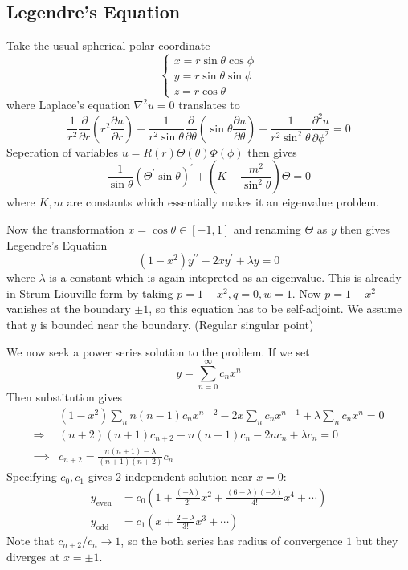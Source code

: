 \documentclass[a4paper]{article}
\begin{document}
\subsection{Legendre's Equation}
Take the usual spherical polar coordinate
$$\begin{cases}
    x=r\sin\theta\cos\phi\\
    y=r\sin\theta\sin\phi\\
    z=r\cos\theta
\end{cases}$$
where Laplace's equation $\nabla^2 u=0$ translates to
$$\frac{1}{r^2}\frac{\partial}{\partial r}\left( r^2\frac{\partial u}{\partial r} \right)+\frac{1}{r^2\sin\theta}\frac{\partial}{\partial\theta}\left( \sin\theta\frac{\partial u}{\partial\theta} \right)+\frac{1}{r^2\sin^2\theta}\frac{\partial^2u}{\partial\phi^2}=0$$
Seperation of variables $u=R(r)\Theta(\theta)\Phi(\phi)$ then gives
$$\frac{1}{\sin\theta}(\Theta^\prime\sin\theta)^\prime+\left( K-\frac{m^2}{\sin^2\theta} \right)\Theta=0$$
where $K,m$ are constants which essentially makes it an eigenvalue problem.

Now the transformation $x=\cos\theta\in[-1,1]$ and renaming $\Theta$ as $y$ then gives Legendre's Equation
\begin{equation}\label{2.eq.21:legendre}
    (1-x^2)y^{\prime\prime}-2xy^\prime+\lambda y=0
\end{equation}
where $\lambda$ is a constant which is again intepreted as an eigenvalue.
This is already in Strum-Liouville form by taking $p=1-x^2,q=0,w=1$.
Now $p=1-x^2$ vanishes at the boundary $\pm 1$, so this equation has to be self-adjoint.
We assume that $y$ is bounded near the boundary. (Regular singular point)

We now seek a power series solution to the problem.
If we set
$$y=\sum_{n=0}^\infty c_nx^n$$
Then substitution gives 
\begin{align}\label{2.eq.22}
    &(1-x^2)\sum_n n(n-1)c_nx^{n-2}-2x \sum_n c_n x^{n-1} + \lambda \sum_n c_n x^n=0\nonumber\\
    \Longrightarrow & (n+2)(n+1)c_{n+2}-n(n-1)c_n-2nc_n+\lambda c_n=0\nonumber\\ 
    \implies &c_{n+2}=\frac{n(n+1)-\lambda}{(n+1)(n+2)}c_n
\end{align}
Specifying $c_0,c_1$ gives 2 independent solution near $ x=0 $:
\begin{align*}
    y_{\text{even}}&=c_0\left( 1+\frac{(-\lambda)}{2!}x^2+\frac{(6-\lambda)(-\lambda)}{4!}x^4+\cdots \right)\\
    y_{\text{odd}}&=c_1\left( x+\frac{2-\lambda}{3!}x^3+\cdots \right)
\end{align*}
Note that $c_{n+2}/c_n\to 1$, so the both series has radius of convergence $1$ but they diverges at $x=\pm 1$.
\end{document}
